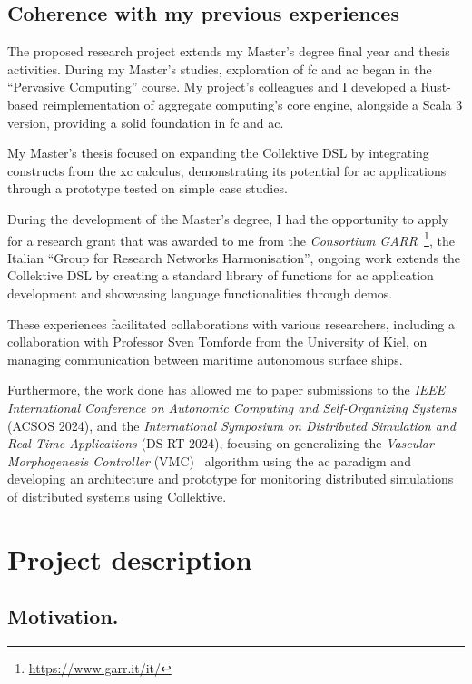 \documentclass[12pt, a4paper]{article}
\begin{document}
\subsection{Coherence with my previous experiences}
\label{subsec:coherence-with-the-educational-path}
The proposed research project extends my Master’s degree final year and thesis activities.
%
During my Master’s studies, exploration of  \ac{fc} and \ac{ac} began in the “Pervasive Computing” course.
%
My project's colleagues and I developed a Rust-based reimplementation of aggregate computing's core engine,
alongside a Scala 3 version, providing a solid foundation in \ac{fc} and \ac{ac}.

My Master’s thesis focused on expanding the Collektive DSL by integrating constructs from the \ac{xc} calculus,
demonstrating its potential for \ac{ac} applications through a prototype tested on simple case studies.

During the development of the Master's degree,
I had the opportunity to apply for a research grant that was awarded to me from the \emph{Consortium GARR}~\footnote{\url{https://www.garr.it/it/}},
the Italian ``Group for Research Networks Harmonisation'',
ongoing work extends the Collektive DSL by creating a standard library of functions for \ac{ac} application development and showcasing language functionalities through demos.

These experiences facilitated collaborations with various researchers, including a collaboration with Professor Sven Tomforde from
the University of Kiel,
on managing communication between maritime autonomous surface ships.

Furthermore,
the work done has allowed me to paper submissions to the \emph{IEEE International Conference on Autonomic Computing and Self-Organizing Systems} (ACSOS 2024),
and the \emph{International Symposium on Distributed Simulation and Real Time Applications} (DS-RT 2024),
focusing on generalizing the \emph{Vascular Morphogenesis Controller} (VMC)~\cite{ZahadatHS17} algorithm using the \ac{ac} paradigm
and developing an architecture and prototype for monitoring distributed simulations of distributed systems using Collektive.

\section{Project description}
\label{sec:project-description}

\subsection{Motivation.}
\label{subsec:motivation.}
\end{document}
